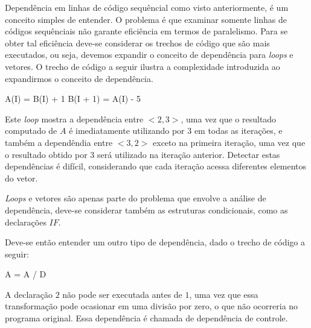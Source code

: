 Dependência em linhas de código sequêncial como visto anteriormente, é um
conceito simples de entender.
O problema é que examinar somente linhas de códigos sequênciais não garante 
eficiência em termos de paralelismo. 
Para se obter tal eficiência deve-se considerar os trechos de
código que são mais executados, ou seja, devemos expandir o conceito de
dependência para \textit{loops} e vetores.
O trecho de código a seguir ilustra a complexidade introduzida ao expandirmos o
conceito de dependência.

\begin{algorithm}
        \begin{algorithmic}[1]
                \STATE A(I) = B(I) + 1
                \STATE B(I + 1) = A(I) - 5
                \ENDFOR
        \end{algorithmic}
\end{algorithm}

Este \textit{loop} mostra a dependência entre $<2,3>$, uma vez que o
resultado computado de $A$ é imediatamente utilizando por $3$ em todas as
iterações, e também a dependêndia entre $<3,2>$ exceto na primeira iteração,
uma vez que o resultado obtido por $3$ será utilizado na iteração anterior.
Detectar estas dependências é difícil, considerando que cada iteração acessa 
diferentes elementos do vetor.

\textit{Loops} e vetores são apenas parte do problema que envolve a análise de
dependência, deve-se considerar também as estruturas condicionais, como as
declarações $IF$.

Deve-se então entender um outro tipo de dependência, dado o trecho de
código a seguir:

\begin{algorithm}
        \begin{algorithmic}[1]
        \STATE A = A / D
        \ENDIF
        \end{algorithmic}
\end{algorithm}

A declaração $2$ não pode ser executada antes de $1$, uma vez que essa
transformação pode ocasionar em uma divisão por zero, o que não ocorreria no
programa original. Essa dependência é chamada de dependência de controle.




